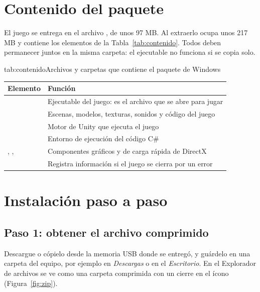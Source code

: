 \documentclass[stu,letterpaper,12pt,donotrepeattitle,floatsintext]{apa7}
\begin{document}
\section{Contenido del paquete}

El juego se entrega en el archivo , de unos 97 MB. Al extraerlo ocupa unos
217 MB y contiene los elementos de la Tabla~\ref{tab:contenido}. Todos deben permanecer juntos en la
misma carpeta: el ejecutable no funciona si se copia solo.

\begin{TablaAPA}{tab:contenido}{Archivos y carpetas que contiene el paquete de Windows}
\begin{tabularx}{\linewidth}{P{5.2cm}L}
\toprule
Elemento & Función \\
\midrule
{} & Ejecutable del juego: es el archivo que se abre para jugar \\
 & Escenas, modelos, texturas, sonidos y código del juego \\
 & Motor de Unity que ejecuta el juego \\
 & Entorno de ejecución del código C\# \\
, ,  & Componentes gráficos y de carga rápida de DirectX \\
 & Registra información si el juego se cierra por un error \\
\bottomrule
\end{tabularx}
\end{TablaAPA}

\section{Instalación paso a paso}

\subsection{Paso 1: obtener el archivo comprimido}

Descargue  o cópielo desde la memoria USB donde se entregó, y guárdelo en una
carpeta del equipo, por ejemplo en \textit{Descargas} o en el \textit{Escritorio}. En el Explorador de
archivos se ve como una carpeta comprimida con un cierre en el ícono (Figura~\ref{fig:zip}).

\end{document}
